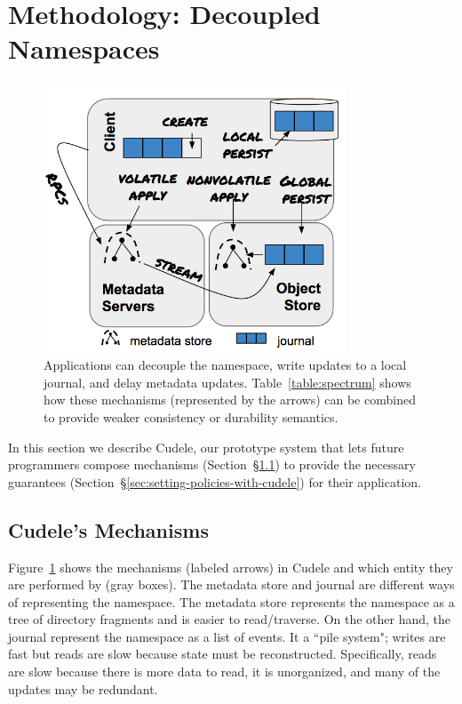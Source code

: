 \section{Methodology: Decoupled Namespaces}
\label{sec:methodology-decoupled-namespaces}

\begin{figure}[tb]
\caption{Applications can decouple the namespace, write updates to a local
journal, and delay metadata updates.  Table~\ref{table:spectrum} shows how
these mechanisms (represented by the arrows) can be combined to provide weaker
consistency or durability semantics.  }\label{fig:decouple}
\centering
\includegraphics[width=90mm]{figures/fig-decouple.png}
\end{figure}

In this section we describe Cudele, our prototype system that lets future
programmers compose mechanisms (Section~\S\ref{sec:cudeles-mechanisms}) to
provide the necessary guarantees
(Section~\S\ref{sec:setting-policies-with-cudele}) for their application.

\subsection{Cudele's Mechanisms}
\label{sec:cudeles-mechanisms}

Figure~\ref{fig:decouple} shows the mechanisms (labeled arrows) in Cudele and
which entity they are performed by (gray boxes). The metadata store and journal
are different ways of representing the namespace. The metadata store represents
the namespace as a tree of directory fragments and is easier to read/traverse.
On the other hand, the journal represent the namespace as a list of events. It
a ``pile system"; writes are fast but reads are slow because state must be
reconstructed.  Specifically, reads are slow because there is more data to
read, it is unorganized, and many of the updates may be redundant.

